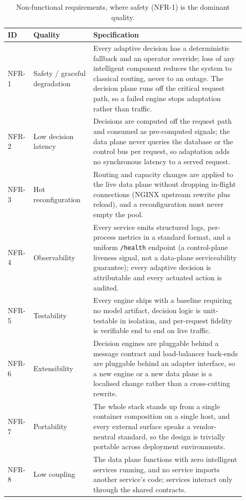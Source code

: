 \begin{table}[H]
\centering
\caption[Non-functional requirements, led by safety]{Non-functional requirements, where safety (NFR-1) is the dominant quality.}
\label{dsa:tab:nfr}
\small
\renewcommand{\arraystretch}{1.25}
\begin{tabular}{@{}p{0.07\linewidth}p{0.24\linewidth}p{0.61\linewidth}@{}}
\toprule
\textbf{ID} & \textbf{Quality} & \textbf{Specification} \\
\midrule
NFR-1 & Safety / graceful degradation & Every adaptive decision has a deterministic
fallback and an operator override; loss of any intelligent component reduces the
system to classical routing, never to an outage. The decision plane runs off the
critical request path, so a failed engine stops adaptation rather than traffic. \\
NFR-2 & Low decision latency & Decisions are computed off the request path and
consumed as pre-computed signals; the data plane never queries the database or the
control bus per request, so adaptation adds no synchronous latency to a served
request. \\
NFR-3 & Hot reconfiguration & Routing and capacity changes are applied to the live
data plane without dropping in-flight connections (NGINX upstream rewrite plus
reload), and a reconfiguration must never empty the pool. \\
NFR-4 & Observability & Every service emits structured logs, per-process metrics in a
standard format, and a uniform \texttt{/health} endpoint (a control-plane liveness
signal, not a data-plane serviceability guarantee); every adaptive decision is
attributable and every actuated action is audited. \\
NFR-5 & Testability & Every engine ships with a baseline requiring no model artifact,
decision logic is unit-testable in isolation, and per-request fidelity is verifiable
end to end on live traffic. \\
NFR-6 & Extensibility & Decision engines are pluggable behind a message contract and
load-balancer back-ends are pluggable behind an adapter interface, so a new engine or
a new data plane is a localised change rather than a cross-cutting rewrite. \\
NFR-7 & Portability & The whole stack stands up from a single container composition on
a single host, and every external surface speaks a vendor-neutral standard, so the
design is trivially portable across deployment environments. \\
NFR-8 & Low coupling & The data plane functions with zero intelligent services
running, and no service imports another service's code; services interact only through
the shared contracts. \\
\bottomrule
\end{tabular}
\end{table}

